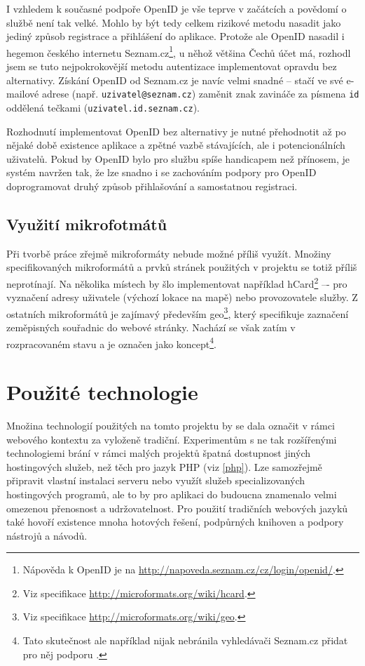 I vzhledem k současné podpoře OpenID je vše teprve v začátcích a
povědomí o službě není tak velké. Mohlo by být tedy celkem rizikové
metodu nasadit jako jediný způsob registrace a přihlášení do aplikace.
Protože ale OpenID nasadil i hegemon českého internetu
Seznam.cz\footnote{Nápověda
k OpenID je na \url{http://napoveda.seznam.cz/cz/login/openid/}.}, u
něhož většina Čechů účet má, rozhodl jsem se tuto nej\-pokrokovější metodu autentizace implementovat opravdu bez alternativy. Získání
OpenID od Seznam.cz je navíc velmi snadné -- stačí ve své e-mailové
adrese (např. {\tt uzivatel@seznam.cz}) zaměnit znak zavináče za
písmena {\tt id} oddělená tečkami ({\tt uzivatel.id.seznam.cz}).

Rozhodnutí implementovat OpenID bez alternativy je nutné přehodnotit
až po nějaké době existence aplikace a zpětné vazbě
stávajících, ale i potencionálních uživatelů. Pokud by OpenID
bylo pro službu spíše handicapem než přínosem, je systém navržen tak,
že lze snadno i se zachováním podpory pro OpenID doprogramovat druhý
způsob přihlašování a samostatnou registraci.

\section{Využití mikrofotmátů}
Při tvorbě práce zřejmě mikroformáty nebude možné příliš využít.
Množiny specifikovaných mikroformátů a prvků stránek použitých v
projektu se totiž příliš neprotínají. Na několika místech by šlo
implementovat například
hCard\footnote{Viz
specifikace \url{http://microformats.org/wiki/hcard}.} –- pro
vyznačení adresy uživatele (výchozí lokace na mapě) nebo
provozovatele služby. Z ostatních mikroformátů je zajímavý především
geo\footnote{Viz specifikace
\url{http://microformats.org/wiki/geo}.}, který specifikuje zaznačení
zeměpisných souřadnic do webové stránky. Nachází se však zatím v
rozpracovaném stavu a je označen jako koncept\footnote{Tato
skutečnost ale například nijak nebránila vyhledávači Seznam.cz přidat
pro něj podporu \cite{geoSeznam}.}.

\chapter{Použité technologie}\label{technologie}
Množina technologií použitých na tomto projektu by se dala označit v
rámci webového kontextu za vyloženě tradiční. Experimentům s ne tak
rozšířenými technologiemi brání v rámci malých projektů špatná
dostupnost jiných hostingových služeb, než těch pro jazyk PHP (viz
\ref{php}). Lze samozřejmě připravit vlastní instalaci serveru nebo
využít služeb specializovaných hostingových programů, ale to by pro aplikaci do
budoucna znamenalo velmi omezenou přenosnost a udržovatelnost. Pro
použití tradičních webových jazyků také hovoří existence mnoha
hotových řešení, podpůrných knihoven a podpory nástrojů a návodů.

